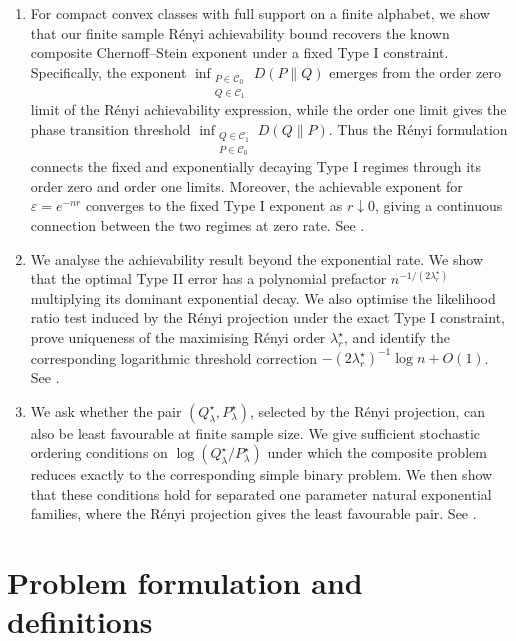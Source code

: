 \documentclass[journal,10pt,draftclsnofoot,onecolumn]{IEEEtran}
\begin{document}
\begin{enumerate}
    \item For compact convex classes with full support on a finite alphabet, we show that our finite sample R\'enyi achievability bound recovers the known composite Chernoff--Stein exponent under a fixed Type I constraint. Specifically, the exponent $\inf_{\substack{P\in\mathcal C_0\\Q\in\mathcal C_1}}D(P\|Q)$ emerges from the order zero limit of the R\'enyi achievability expression, while the order one limit gives the phase transition threshold $\inf_{\substack{Q\in\mathcal C_1\\P\in\mathcal C_0}}D(Q\|P)$. Thus the R\'enyi formulation connects the fixed and exponentially decaying Type I regimes through its order zero and order one limits. Moreover, the achievable exponent for $\varepsilon=e^{-nr}$ converges to the fixed Type I exponent as $r\downarrow0$, giving a continuous connection between the two regimes at zero rate. See .
     
    \item We analyse the achievability result beyond the exponential rate. We show that the optimal Type II error has a polynomial prefactor $n^{-1/(2\lambda_r^\star)}$ multiplying its dominant exponential decay. We also optimise the likelihood ratio test induced by the R\'enyi projection under the exact Type I constraint, prove uniqueness of the maximising R\'enyi order $\lambda_r^\star$, and identify the corresponding logarithmic threshold correction $-(2\lambda_r^\star)^{-1}\log n+O(1)$. See .

    \item We ask whether the pair $(Q_\lambda^\star,P_\lambda^\star)$, selected by the R\'enyi projection, can also be least favourable at finite sample size. We give sufficient stochastic ordering conditions on $\log(Q_\lambda^\star/P_\lambda^\star)$ under which the composite problem reduces exactly to the corresponding simple binary problem. We then show that these conditions hold for separated one parameter natural exponential families, where the R\'enyi projection gives the least favourable pair. See .

\end{enumerate}

\section{Problem formulation and definitions}
\label{sec:problem-formulation}
\end{document}
